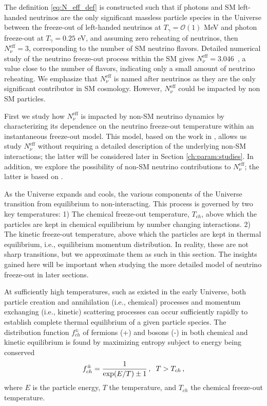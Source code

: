 The definition \ref{eq:N_eff_def} is constructed such that if photons and SM left-handed neutrinos are the only significant massless particle species in the Universe between the freeze-out of left-handed neutrinos at $T_\gamma=\mathcal{O}(1)$ MeV and photon freeze-out at $T_\gamma=0.25$ eV, and assuming zero reheating of neutrinos, then $N^{\text{eff}}_{\nu}=3$, corresponding to the number of SM neutrino flavors. Detailed numerical study of the neutrino freeze-out process within the SM gives $N^{\text{eff}}_{\nu}=3.046$~\cite{Mangano:2005cc}, a value close to the number of flavors, indicating only a small amount of neutrino reheating. 
 We emphasize that $N^{\text{eff}}_\nu$ is named after neutrinos as they are the only significant contributor in SM cosmology. However, $N^{\text{eff}}_\nu$ could be impacted by non SM particles.

First we study how $N^{\text{eff}}_{\nu}$ is impacted by non-SM neutrino dynamics by characterizing its dependence on the neutrino freeze-out temperature within an instantaneous freeze-out model. This model, based on the work in \cite{Birrell:2013gpa,Birrell:2012gg}, allows us study $N^{\text{eff}}_{\nu}$ without requiring a detailed description of the underlying non-SM interactions; the latter will be considered later in Section \ref{ch:param:studies}. In addition, we explore the possibility of non-SM neutrino contributions to $N^{\text{eff}}_\nu$; the latter is based on \cite{Birrell:2014cja}.


As the Universe expands and cools, the various components of the Universe transition from equilibrium to non-interacting. This process is governed by two key temperatures: 1) The chemical freeze-out temperature, $T_{ch}$, above which the particles are kept in chemical equilibrium by number changing interactions. 2) The kinetic freeze-out temperature, above which the particles are kept in thermal equilibrium, i.e., equilibrium momentum distribution. In reality, these are not sharp transitions, but we approximate them as such in this section. The insights gained here will be important when studying the more detailed model of neutrino freeze-out in later sections.

At sufficiently high temperatures, such as existed in the early Universe, both particle creation and annihilation (i.e., chemical) processes and momentum exchanging (i.e., kinetic) scattering processes can occur sufficiently rapidly to establish complete thermal equilibrium of a given particle species. The distribution function $f_{ch}^\pm$ of fermions (+) and bosons (-) in both chemical and kinetic equilibrium is found by maximizing entropy subject to energy being conserved
\begin{equation}\label{ch_eq}
f_{ch}^\pm=\frac{1}{\exp(E/T)\pm 1}\,, \hspace{2mm} T>T_{ch}\,,
\end{equation}
where $E$ is the particle energy, $T$ the temperature, and $T_{ch}$ the chemical freeze-out temperature. 

